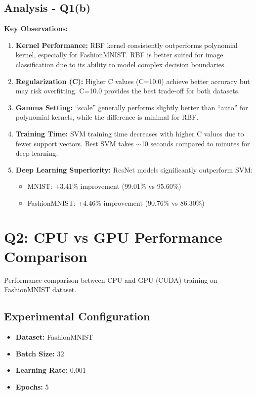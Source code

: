 \documentclass[11pt,a4paper]{article}
\begin{document}
\subsection{Analysis - Q1(b)}

\textbf{Key Observations:}

\begin{enumerate}
    \item \textbf{Kernel Performance:} RBF kernel consistently outperforms polynomial kernel, especially for FashionMNIST. RBF is better suited for image classification due to its ability to model complex decision boundaries.
    
    \item \textbf{Regularization (C):} Higher C values (C=10.0) achieve better accuracy but may risk overfitting. C=10.0 provides the best trade-off for both datasets.
    
    \item \textbf{Gamma Setting:} ``scale'' generally performs slightly better than ``auto'' for polynomial kernels, while the difference is minimal for RBF.
    
    \item \textbf{Training Time:} SVM training time decreases with higher C values due to fewer support vectors. Best SVM takes $\sim$10 seconds compared to minutes for deep learning.
    
    \item \textbf{Deep Learning Superiority:} ResNet models significantly outperform SVM:
    \begin{itemize}
        \item MNIST: +3.41\% improvement (99.01\% vs 95.60\%)
        \item FashionMNIST: +4.46\% improvement (90.76\% vs 86.30\%)
    \end{itemize}
\end{enumerate}

\section{Q2: CPU vs GPU Performance Comparison}

Performance comparison between CPU and GPU (CUDA) training on FashionMNIST dataset.

\subsection{Experimental Configuration}
\begin{itemize}
    \item \textbf{Dataset:} FashionMNIST
    \item \textbf{Batch Size:} 32
    \item \textbf{Learning Rate:} 0.001
    \item \textbf{Epochs:} 5
\end{itemize}
\end{document}
